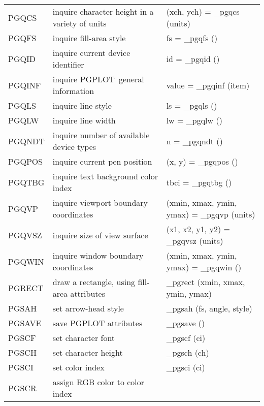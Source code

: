 \documentclass{book}
\newcommand{\pgplot}{{\sc PGPLOT}}
\begin{document}
{\begin{center}
\begin{tabular}{|l|p{2.5in}|p{2.25in}|}
PGQCS & inquire character height in a variety of units                 &
(xch, ych) = \_pgqcs (units) \\
PGQFS & inquire fill-area style                                             &
fs = \_pgqfs () \\
PGQID & inquire current device identifier                               &
id = \_pgqid () \\
PGQINF & inquire \pgplot\ general information                             &
value = \_pgqinf (item) \\
PGQLS & inquire line style                                             &
ls = \_pgqls () \\
PGQLW & inquire line width                                             &
lw = \_pgqlw () \\
PGQNDT & inquire number of available device types                                             &
n = \_pgqndt () \\
PGQPOS & inquire current pen position                                             &
(x, y) = \_pgqpos () \\
PGQTBG & inquire text background color index                                            &
tbci = \_pgqtbg () \\
PGQVP & inquire viewport boundary coordinates                    &
(xmin, xmax, ymin, ymax) = \_pgqvp (units) \\
PGQVSZ & inquire size of view surface                    &
(x1, x2, y1, y2) = \_pgqvsz (units) \\
PGQWIN & inquire window boundary coordinates                    &
(xmin, xmax, ymin, ymax) = \_pgqwin () \\
PGRECT & draw a rectangle, using fill-area attributes                    &
\_pgrect (xmin, xmax, ymin, ymax) \\
PGSAH & set arrow-head style                                            &
\_pgsah (fs, angle, style) \\
PGSAVE & save PGPLOT attributes                                         &
\_pgsave () \\
PGSCF & set character font                                              &
\_pgscf (ci) \\
PGSCH & set character height                                            &
\_pgsch (ch) \\
PGSCI & set color index                                                 &
\_pgsci (ci) \\
PGSCR & assign RGB color to color index                              &

\end{tabular}
\end{center}}
\end{document}
